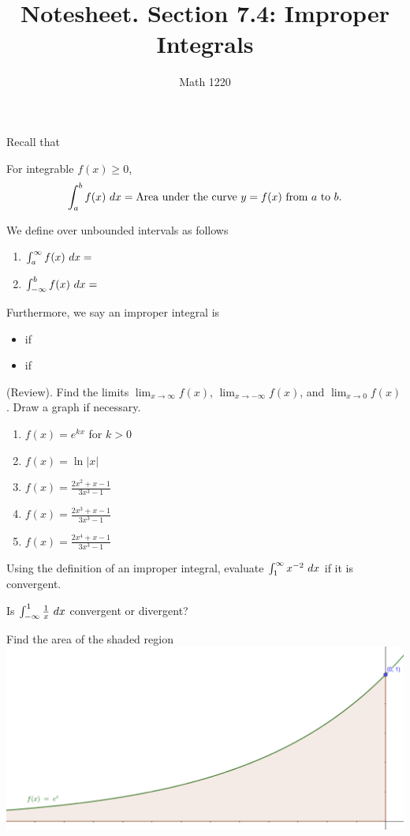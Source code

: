 \documentclass[12pt, a4paper]{article}
\author{Math 1220}
\title{Notesheet. Section 7.4: Improper Integrals}
\date{}
\begin{document}
\maketitle
\nameline
Recall that
\begin{thrm}
  For integrable \(f(x) \geq 0\), \[
    \int_a^b f(x) \ d x = \text{Area under the curve }y=f(x)\text{ from
    }a \text{ to }b.
  \]
\end{thrm}
\vspace{-1in}
\begin{defi}
  We define  over unbounded intervals as
  follows
  \begin{enumerate}
  \item \(\int_a^\infty f(x) \ d x = \)
  \item \(\int_{-\infty}^b f(x) \ d x =\)
  \end{enumerate}
  Furthermore, we say an improper integral is
  \begin{itemize}
  \item {} if
  \item {} if
  \end{itemize}
\end{defi}
\vspace{-1in}
\begin{ex}
  (Review). Find the limits
  \(\lim_{x \to \infty} f(x)\), \(\lim_{x \to -\infty} f(x)\), and
  \(\lim_{x \to 0} f(x)\). Draw
  a graph if necessary.
  \begin{enumerate}
  \item \(f(x) = e^{kx}\) for \(k > 0\)
  \item \(f(x) = \ln|x|\)
  \item \(f(x) = \frac{2x^2+x-1}{3x^3-1}\)
  \item \(f(x) = \frac{2x^3+x-1}{3x^3-1}\)
  \item \(f(x) = \frac{2x^4+x-1}{3x^3-1}\)
  \end{enumerate}
\end{ex}
\begin{ex}
  Using the definition of an improper integral, evaluate
  \(\int_1^\infty x^{-2} \ d x\) if it is convergent. 
\end{ex}
\begin{ex}
  Is \(\int_{-\infty}^1 \frac{1}{x} \ d x\) convergent or divergent?
\end{ex}
\begin{ex}
  Find the area of the shaded region \\
  \includegraphics[scale=0.25]{images/e-improper-integral}
\end{ex}
\end{document}
